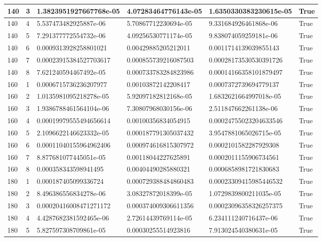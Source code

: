 \documentclass[a4paper, 12pt]{report}
\def\tabsize{4.4cm}
\def\stabsize{0.97cm}
\def\mtabsize{0.73cm}
\begin{document}
\begin{center}
\begin{longtable}{|m{\stabsize}|m{\stabsize}|m{\tabsize}|m{\tabsize}|m{\tabsize}|m{\mtabsize}|}
140 & 3 & 1.3823951927667768e-05 & 4.07283464776143e-05 & 1.6350330383230615e-05 & True \\ \hline  
140 & 4 & 5.537473482925887e-06 & 5.70867712230694e-05 & 9.331684926461868e-06 & True \\ \hline  
140 & 5 & 7.291377772554732e-06 & 4.09256530771174e-05 & 9.838074059259181e-06 & True \\ \hline  
140 & 6 & 0.0009313928258801021 & 0.00429885205212011 & 0.0011714139039855143 & True \\ \hline  
140 & 7 & 0.00023915384527703617 & 0.000855739216087503 & 0.00028173530530391726 & True \\ \hline  
140 & 8 & 7.621240594467492e-05 & 0.000733783284823986 & 0.00014166358101879497 & True \\ \hline  
160 & 1 & 0.0006715736236207977 & 0.00103872142208417 & 0.0007372739694779137 & True \\ \hline  
160 & 2 & 1.0135981095218278e-05 & 5.92097182812168e-05 & 1.6832621664997018e-05 & True \\ \hline  
160 & 3 & 1.9386788461564104e-06 & 7.30807968030156e-06 & 2.511847662261138e-06 & True \\ \hline  
160 & 4 & 0.00019979555494656614 & 0.00100356834054915 & 0.00024755023204633546 & True \\ \hline  
160 & 5 & 2.1096622146623332e-05 & 0.000187791305037432 & 3.9547881065026715e-05 & True \\ \hline  
160 & 6 & 0.00011040155964962406 & 0.000974616815307972 & 0.0002101582287929308 & True \\ \hline  
160 & 7 & 8.877681077445051e-05 & 0.00118044227625891 & 0.0002011155906734561 & True \\ \hline  
160 & 8 & 0.000358343598941495 & 0.00404490285880321 & 0.0006858981721830683 & True \\ \hline  
180 & 1 & 0.000187405099336724 & 0.000729388484860483 & 0.00023309415985446532 & True \\ \hline  
180 & 2 & 8.496386556834278e-06 & 3.08327872018399e-05 & 1.0729839800211035e-05 & True \\ \hline  
180 & 3 & 0.00020416008471271172 & 0.000374009306611356 & 0.00023096358326257375 & True \\ \hline  
180 & 4 & 4.4287682381592465e-06 & 2.72614439769114e-05 & 6.234111240716437e-06 & True \\ \hline  
180 & 5 & 5.827597308709861e-05 & 0.00030255514923816 & 7.913024540380631e-05 & True \\ \hline  

\end{longtable}
\end{center}
\end{document}
